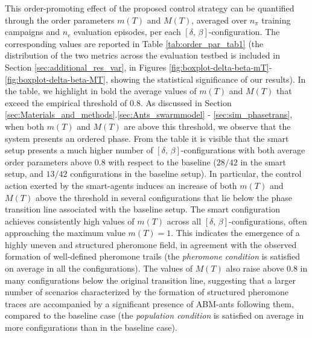 \documentclass[openacc]{rsproca_new}%
\begin{document}
This order-promoting effect of the proposed control strategy can be quantified through the order parameters $m(T)$ and $M(T)$, averaged over $n_{\pi}$ training campaigns and $n_{e}$ evaluation episodes, per each $\left[ \delta, \, \beta \right]$-configuration. The corresponding values are reported in Table \ref{tab:order_par_tab1} (the distribution of the two metrics across the evaluation testbed is included in Section \ref{sec:additional_res_var}, in Figures \ref{fig:boxplot-delta-beta-mT}-\ref{fig:boxplot-delta-beta-MT}, showing the statistical significance of our results). In the table, we highlight in bold the average values of $m(T)$ and $M(T)$ that exceed the empirical threshold of $0.8$. As discussed in Section \ref{sec:Materials_and_methods}.\ref{sec:Ants_swarmmodel} - \ref{sec:sim_phasetrans}, when both $m(T)$ and $M(T)$ are above this threshold, we observe that the system presents an ordered phase. From the table it is visible that the smart setup presents a much higher number of $\left[ \delta, \, \beta \right]$-configurations with both average order parameters above $0.8$ with respect to the baseline ($28/42$ in the smart setup, and $13/42$ configurations in the baseline setup). In particular, the control action exerted by the smart-agents induces an increase of both $m(T)$ and $M(T)$ above the threshold in several configurations that lie below the phase transition line associated with the baseline setup. The smart configuration achieves consistently high values of $m(T)$ across all $\left[ \delta, \, \beta \right]$-configurations, often approaching the maximum value $m(T)=1$. This indicates the emergence of a highly uneven and structured pheromone field, in agreement with the observed formation of well-defined pheromone trails (the \textit{pheromone condition} is satisfied on average in all the configurations). The values of $M(T)$ also raise above $0.8$ in many configurations below the original transition line, suggesting that a larger number of scenarios characterized by the formation of structured pheromone traces are accompanied by a significant presence of ABM-ants following them, compared to the baseline case (the \textit{population condition} is satisfied on average in more configurations than in the baseline case). 
\end{document}
